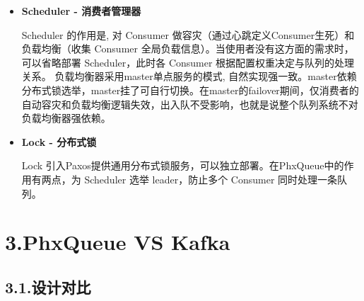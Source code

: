 \documentclass{article}
\begin{document}
\begin{itemize}
\item{}
\textbf{Scheduler - 消费者管理器}%

  \hspace*{1em}\hspace*{1em}Scheduler 的作用是, 对 Consumer 做容灾（通过心跳定义Consumer生死）和负载均衡（收集 Consumer 全局负载信息）。当使用者没有这方面的需求时，可以省略部署 Scheduler，此时各 Consumer 根据配置权重决定与队列的处理关系。
\mdbr
{}  \hspace*{1em}\hspace*{1em}负载均衡器采用master单点服务的模式, 自然实现强一致。master依赖分布式锁选举，master挂了可自行切换。在master的failover期间，仅消费者的自动容灾和负载均衡逻辑失效，出入队不受影响，也就是说整个队列系统不对负载均衡器强依赖。%

\item{}
\textbf{Lock - 分布式锁}%

  \hspace*{1em}\hspace*{1em} Lock 引入Paxos提供通用分布式锁服务，可以独立部署。在PhxQueue中的作用有两点，为 Scheduler 选举 leader，防止多个 Consumer 同时处理一条队列。%
\end{itemize}%

\section{3.\hspace*{0.5em}PhxQueue VS Kafka}\label{sec-phxqueue-vs-kafka}%

\subsection{3.1.\hspace*{0.5em}设计对比}\label{section}%
\end{document}
